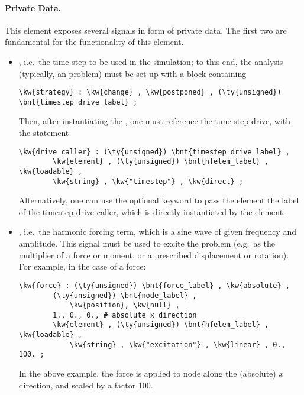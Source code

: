 \paragraph{Private Data.}
This element exposes several signals in form of private data.
The first two are fundamental for the functionality of this element.
\begin{itemize}
\item {}, i.e.\ the time step to be used in the simulation; to this end, the analysis (typically, an  problem) must be set up with a  block containing
\begin{Verbatim}[commandchars=\\\{\}]
    \kw{strategy} : \kw{change} , \kw{postponed} , (\ty{unsigned}) \bnt{timestep_drive_label} ;
\end{Verbatim}
Then, after instantiating the , one must reference the time step drive, with the statement
\begin{Verbatim}[commandchars=\\\{\}]
    \kw{drive caller} : (\ty{unsigned}) \bnt{timestep_drive_label} ,
        \kw{element} , (\ty{unsigned}) \bnt{hfelem_label} , \kw{loadable} ,
        \kw{string} , \kw{"timestep"} , \kw{direct} ;
\end{Verbatim}
Alternatively, one can use the optional keyword  to pass the element the label of the timestep drive caller,
which is directly instantiated by the element.

\item {}, i.e.\ the harmonic forcing term, which is a sine wave of given frequency and  amplitude.
This signal must be used to excite the problem (e.g.\ as the multiplier of a force or moment, or a prescribed displacement or rotation).
For example, in the case of a force:
\begin{Verbatim}[commandchars=\\\{\}]
    \kw{force} : (\ty{unsigned}) \bnt{force_label} , \kw{absolute} ,
        (\ty{unsigned}) \bnt{node_label} ,
            \kw{position}, \kw{null} ,
        1., 0., 0., # absolute x direction
        \kw{element} , (\ty{unsigned}) \bnt{hfelem_label} , \kw{loadable} ,
            \kw{string} , \kw{"excitation"} , \kw{linear} , 0., 100. ;
\end{Verbatim}
In the above example, the force is applied to node 
along the (absolute) $x$ direction, and scaled by a factor 100.


\end{itemize}
